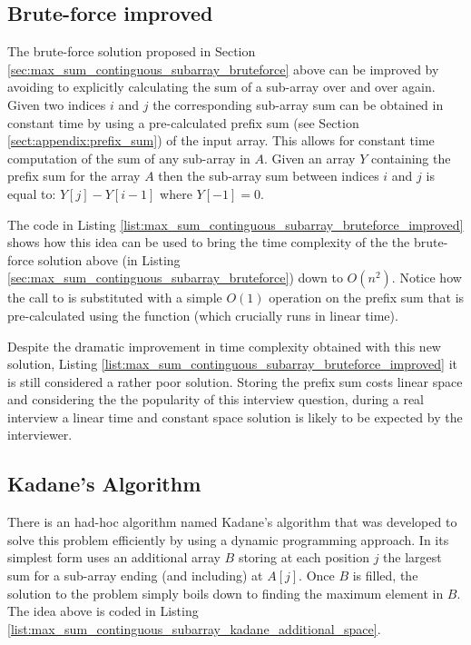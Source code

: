 \subsection{Brute-force improved}
\label{max_sum_continguous_subarray:sec:bruteforce_improved}
The brute-force solution proposed in Section \ref{sec:max_sum_continguous_subarray_bruteforce} above can be
improved by avoiding to explicitly calculating the sum of a sub-array over and over again.
Given two indices $i$ and $j$ the corresponding sub-array sum can be obtained in constant time by using a pre-calculated
prefix sum (see Section \ref{sect:appendix:prefix_sum}) of the input array.
This allows for constant time computation of the sum of any sub-array in $A$. Given an array $Y$ containing the prefix sum for the
array $A$ then the sub-array sum between indices $i$ and $j$ is equal to: $Y[j]-Y[i-1]$ where $Y[-1] = 0$.

The code in Listing \ref{list:max_sum_continguous_subarray_bruteforce_improved} shows how this idea can be used to bring the time complexity of the the brute-force solution above (in Listing \ref{sec:max_sum_continguous_subarray_bruteforce}) down to $O(n^2)$. 
Notice how the call to  is substituted with a simple $O(1)$ operation on the prefix sum that is pre-calculated using the function  (which crucially runs in linear time).



Despite the dramatic improvement in time complexity obtained with this new solution, Listing
\ref{list:max_sum_continguous_subarray_bruteforce_improved} it is still considered a rather poor solution.
Storing the prefix sum costs linear space and  considering the the popularity of this interview question, during a real
interview a linear time and constant space solution is likely to be expected by the interviewer.

\subsection{Kadane's Algorithm}
\label{sec:kadane_algorithm}
There is an had-hoc algorithm named Kadane's algorithm that was developed to solve this problem efficiently by using a dynamic programming approach.
In its simplest form uses an additional array $B$ storing at each position $j$ the largest sum for a
sub-array ending (and including) at $A[j]$. Once $B$
is filled, the solution to the problem simply boils down to finding the maximum element in $B$. The idea above is coded 
in Listing \ref{list:max_sum_continguous_subarray_kadane_additional_space}.



